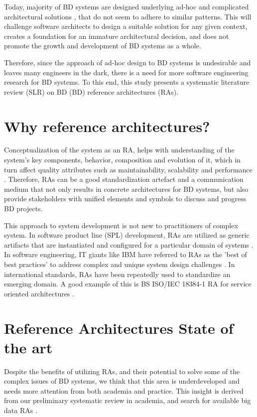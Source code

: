 \documentclass{ieeeaccess}
\begin{document}
Today, majority of BD systems are designed underlying ad-hoc and complicated architectural solutions \cite{Gorton}, that do not seem to adhere to similar patterns. This will challenge software architects to design a suitable solution for any given context, creates a foundation for an immature architectural decision, and does not promote the growth and development of BD systems as a whole. 

Therefore, since the approach of ad-hoc design to BD systems is undesirable and leaves many engineers in the dark, there is a need for more software engineering research for BD systems. To this end, this study presents a systematic literature review (SLR) on BD (BD) reference architectures (RAs). 

\section{Why reference architectures?}
Conceptualization of the system as an RA, helps with understanding of the system’s key components, behavior, composition and evolution of it, which in turn affect quality attributes such as maintainability, scalability and performance \cite{Cloutier}. Therefore, RAs can be a good standardization artefact and a communication medium that not only results in concrete architectures for BD systems, but also provide stakeholders with unified elements and symbols to discuss and progress BD projects.

This approach to system development is not new to practitioners of complex system. In software product line (SPL) development, RAs are utilized as generic artifacts that are instantiated and configured for a particular domain of systems \cite{Derras}. In software engineering, IT giants like IBM have referred to RAs as the 'best of best practices' to address complex and unique system design challenges \cite{Cloutier}. In international standards, RAs have been repeatedly used to standardize an emerging domain. A good example of this is BS ISO/IEC 18384-1 RA for service oriented architectures \cite{Iso18384-1}. 

\section{Reference Architectures State of the art}

Despite the benefits of utilizing RAs, and their potential to solve some of the complex issues of BD systems, we think that this area is underdeveloped and needs more attention from both academia and practice. This insight is derived from our preliminary systematic review in academia, and search for available big data RAs \cite{AtaeiACIS}.
\end{document}

